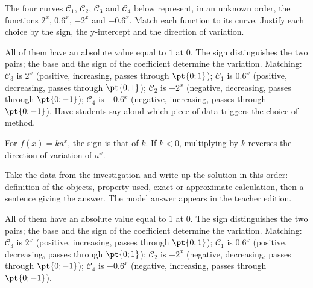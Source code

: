 \begin{activity}
The four curves $\mathcal C_1$, $\mathcal C_2$, $\mathcal C_3$ and $\mathcal C_4$ below represent, in an unknown order, the functions $2^x$, $\num{0,6}^x$, $-2^x$ and $-\num{0,6}^x$. Match each function to its curve. Justify each choice by the sign, the y-intercept and the direction of variation.
\begin{center}\end{center}
\end{activity}
\begin{solution}All of them have an absolute value equal to $1$ at $0$. The sign distinguishes the two pairs; the base and the sign of the coefficient determine the variation. Matching: $\mathcal C_3$ is $2^x$ (positive, increasing, passes through $\pt{0;1}$); $\mathcal C_1$ is $\num{0,6}^x$ (positive, decreasing, passes through $\pt{0;1}$); $\mathcal C_2$ is $-2^x$ (negative, decreasing, passes through $\pt{0;-1}$); $\mathcal C_4$ is $-\num{0,6}^x$ (negative, increasing, passes through $\pt{0;-1}$). Have students say aloud which piece of data triggers the choice of method.\end{solution}

\begin{summary}For $f(x)=ka^x$, the sign is that of $k$. If $k<0$, multiplying by $k$ reverses the direction of variation of $a^x$.\end{summary}

\begin{example}
Take the data from the investigation and write up the solution in this order: definition of the objects, property used, exact or approximate calculation, then a sentence giving the answer. The model answer appears in the teacher edition.
\end{example}
\begin{solution}All of them have an absolute value equal to $1$ at $0$. The sign distinguishes the two pairs; the base and the sign of the coefficient determine the variation. Matching: $\mathcal C_3$ is $2^x$ (positive, increasing, passes through $\pt{0;1}$); $\mathcal C_1$ is $\num{0,6}^x$ (positive, decreasing, passes through $\pt{0;1}$); $\mathcal C_2$ is $-2^x$ (negative, decreasing, passes through $\pt{0;-1}$); $\mathcal C_4$ is $-\num{0,6}^x$ (negative, increasing, passes through $\pt{0;-1}$).\end{solution}

